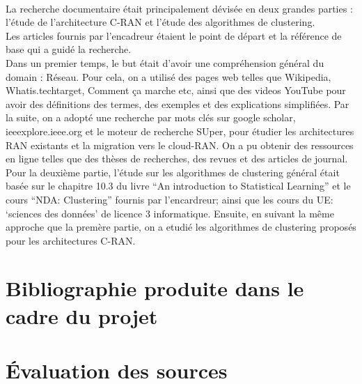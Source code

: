 \documentclass{article}
\begin{document}
\paragraph{}
La recherche documentaire était principalement dévisée en deux grandes parties : 
l’étude de l’architecture C-RAN et l’étude des algorithmes de clustering.\\
Les articles fournis par l’encadreur étaient le point de départ et la référence 
de base qui a guidé la recherche. \\
Dans un premier temps, le but était d’avoir une compréhension général du domain : Réseau. 
Pour cela, on a utilisé des pages web telles que Wikipedia, Whatis.techtarget, Comment ça marche 
etc, ainsi que des videos YouTube pour avoir des définitions des termes, des exemples et des 
explications simplifiées. Par la suite, on a adopté une recherche par mots clés sur google 
scholar, ieeexplore.ieee.org et le moteur de recherche SUper, pour étudier les architectures 
RAN existants et la migration vers le cloud-RAN. On a pu obtenir des ressources en ligne telles 
que des thèses de recherches, des revues et des articles de journal.\\
Pour la deuxième partie, l’étude sur les algorithmes de clustering général était basée sur le chapitre 10.3 du livre “An introduction to Statistical Learning” et le cours “NDA: Clustering” fournis par l’encardreur; ainsi que les cours du UE: ‘sciences des données’ de licence 3 informatique. Ensuite, en suivant la même approche que la premère partie, on a etudié les algorithmes de clustering proposés pour les architectures C-RAN.
\section{Bibliographie produite dans le cadre du projet}
\section{Évaluation des sources}
\end{document}
